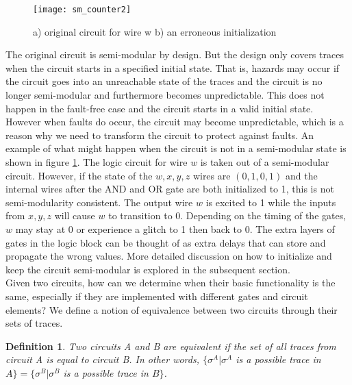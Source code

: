\documentclass[12pt]{report}
\newtheorem*{definition}{Definition}
\begin{document}
\begin{figure}
  \centering
    \texttt{[image: sm\_counter2]}
  \caption{a) original circuit for wire w b) an erroneous initialization}
  \label{fig:sm_counter2}
\end{figure}

The original circuit is semi-modular by design.  But the design only covers traces when the circuit starts in a specified initial state.  That is, hazards may occur if the circuit goes into an unreachable state of the traces and the circuit is no longer semi-modular and furthermore becomes unpredictable.  This does not happen in the fault-free case and the circuit starts in a valid initial state.  However when faults do occur, the circuit may become unpredictable, which is a reason why we need to transform the circuit to protect against faults.  An example of what might happen when the circuit is not in a semi-modular state is shown in figure \ref{fig:sm_counter2}.  The logic circuit for wire $w$ is taken out of a semi-modular circuit.  However, if the state of the $w,x,y,z$ wires are $(0,1,0,1)$ and the internal wires after the AND and OR gate are both initialized to 1, this is not semi-modularity consistent.  The output wire $w$ is excited to 1 while the inputs from $x,y,z$ will cause $w$ to transition to 0.  Depending on the timing of the gates, $w$ may stay at 0 or experience a glitch to 1 then back to 0.  The extra layers of gates in the logic block can be thought of as extra delays that can store and propagate the wrong values.  More detailed discussion on how to initialize and keep the circuit semi-modular is explored in the subsequent section.\\

Given two circuits, how can we determine when their basic functionality is the same, especially if they are implemented with different gates and circuit elements?  We define a notion of equivalence between two circuits through their sets of traces.  
\begin{definition} Two circuits A and B are {\em equivalent} if the set of all traces from circuit A is equal to circuit B.  In other words, $\{\sigma^A |\sigma^A$ is a possible trace in $A\}=\{\sigma^B |\sigma^B$ is a possible trace in $B\}$.
\end{definition}
\end{document}
